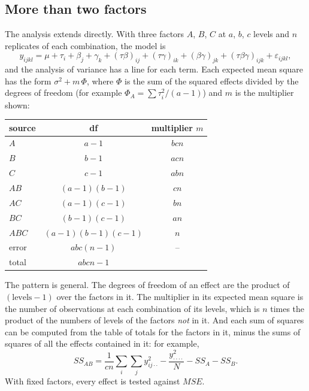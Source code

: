 \documentclass[11pt,a4paper]{article}
\numberwithin{equation}{section}
\theoremstyle{definition}
\begin{document}
\subsection{More than two factors}
The analysis extends directly. With three factors $A$, $B$, $C$ at $a$, $b$, $c$ levels and $n$ replicates of each combination, the model is
\[
y_{ijkl} = \mu + \tau_i + \beta_j + \gamma_k + (\tau\beta)_{ij} + (\tau\gamma)_{ik} + (\beta\gamma)_{jk} + (\tau\beta\gamma)_{ijk} + \varepsilon_{ijkl} ,
\]
and the analysis of variance has a line for each term. Each expected mean square has the form $\sigma^2 + m\,\Phi$, where $\Phi$ is the sum of the squared
effects divided by the degrees of freedom (for example $\Phi_A = \sum\tau_i^2/(a - 1)$) and $m$ is the multiplier shown:
\begin{center}
\begin{tabular}{l|c|c}
source & df & multiplier $m$ \\
\hline
$A$ & $a - 1$ & $bcn$ \\
$B$ & $b - 1$ & $acn$ \\
$C$ & $c - 1$ & $abn$ \\
$AB$ & $(a - 1)(b - 1)$ & $cn$ \\
$AC$ & $(a - 1)(c - 1)$ & $bn$ \\
$BC$ & $(b - 1)(c - 1)$ & $an$ \\
$ABC$ & $(a - 1)(b - 1)(c - 1)$ & $n$ \\
error & $abc(n - 1)$ & -- \\
\hline
total & $abcn - 1$ &
\end{tabular}
\end{center}
The pattern is general. The degrees of freedom of an effect are the product of $(\text{levels} - 1)$ over the factors in it. The multiplier in its expected mean
square is the number of observations at each combination of its levels, which is $n$ times the product of the numbers of levels of the factors
\emph{not} in it. And each sum of squares can be computed from the table of totals for the factors in it, minus the sums of squares of all the
effects contained in it: for example,
\[
SS_{AB} = \frac{1}{cn}\sum_i\sum_jy_{ij\cdot\cdot}^2 - \frac{y_{\cdot\cdot\cdot\cdot}^2}{N} - SS_A - SS_B .
\]
With fixed factors, every effect is tested against $MSE$.
\end{document}
